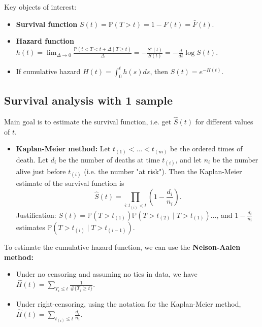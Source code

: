 \documentclass[twoside]{article}
\newcommand\bbP{\mathbb{P}}
\newcommand\Dlt{\Delta}
\newcommand\goesto{\rightarrow}
\begin{document}
Key objects of interest:
\begin{itemize}
\item \textbf{Survival function} $S(t) = \bbP(T > t) = 1 - F(t) = \bar{F}(t)$.

\item \textbf{Hazard function} $h(t) = \displaystyle\lim_{\Dlt \goesto 0}\frac{\bbP (t < T < t + \Dlt \mid T \geq t)}{\Dlt} = - \displaystyle\frac{S'(t)}{S(t)} = - \frac{d}{dt}\log S(t)$.

\item If cumulative hazard $H(t) = \displaystyle\int_0^t h(s) ds$, then $S(t) = e^{-H(t)}$.
\end{itemize}

\subsection{Survival analysis with 1 sample}
Main goal is to estimate the survival function, i.e. get $\hat{S}(t)$ for different values of $t$.

\begin{itemize}
\item \textbf{Kaplan-Meier method:} Let $t_{(1)} < \dots < t_{(m)}$ be the ordered times of death. Let $d_i$ be the number of deaths at time $t_{(i)}$, and let $n_i$ be the number alive just before $t_{(i)}$ (i.e. the number "at risk"). Then the Kaplan-Meier estimate of the survival function is
\begin{equation*}
\hat{S}(t) = \prod_{i: t_{(i)} < t} \left( 1 - \frac{d_i}{n_i}\right).
\end{equation*}
Justification: $S(t) = \bbP (T > t_{(1)}) \bbP (T > t_{(2)} \mid T > t_{(1)}) \dots$, and $1 - \frac{d_i}{n_i}$ estimates $\bbP (T > t_{(i)} \mid T > t_{(i-1)})$.

\end{itemize}

To estimate the cumulative hazard function, we can use the \textbf{Nelson-Aalen method:}
\begin{itemize}
\item Under no censoring and assuming no ties in data, we have $\hat{H}(t) = \displaystyle\sum_{T_i \leq t}\frac{1}{\# \{ T_j \geq t \}}$.

\item Under right-censoring, using the notation for the Kaplan-Meier method, $\hat{H}(t) = \displaystyle\sum_{t_{(i)} \leq t}\frac{d_i}{n_i}$.
\end{itemize}
\end{document}
